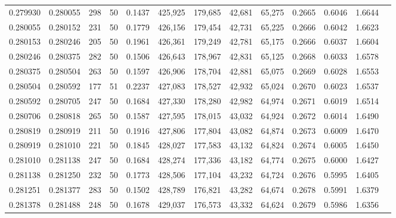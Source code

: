 \begin{tabular}{rrrrrrrrrrrrr}
0.279930 & 0.280055 &   298 &  50 &                                     0.1437 & 425,925 & 179,685 &  42,681 &  65,275 & 0.2665 & 0.6046 & 1.6644 \\
0.280055 & 0.280152 &   231 &  50 &                                     0.1779 & 426,156 & 179,454 &  42,731 &  65,225 & 0.2666 & 0.6042 & 1.6623 \\
0.280153 & 0.280246 &   205 &  50 &                                     0.1961 & 426,361 & 179,249 &  42,781 &  65,175 & 0.2666 & 0.6037 & 1.6604 \\
0.280246 & 0.280375 &   282 &  50 &                                     0.1506 & 426,643 & 178,967 &  42,831 &  65,125 & 0.2668 & 0.6033 & 1.6578 \\
0.280375 & 0.280504 &   263 &  50 &                                     0.1597 & 426,906 & 178,704 &  42,881 &  65,075 & 0.2669 & 0.6028 & 1.6553 \\
0.280504 & 0.280592 &   177 &  51 &                                     0.2237 & 427,083 & 178,527 &  42,932 &  65,024 & 0.2670 & 0.6023 & 1.6537 \\
0.280592 & 0.280705 &   247 &  50 &                                     0.1684 & 427,330 & 178,280 &  42,982 &  64,974 & 0.2671 & 0.6019 & 1.6514 \\
0.280706 & 0.280818 &   265 &  50 &                                     0.1587 & 427,595 & 178,015 &  43,032 &  64,924 & 0.2672 & 0.6014 & 1.6490 \\
0.280819 & 0.280919 &   211 &  50 &                                     0.1916 & 427,806 & 177,804 &  43,082 &  64,874 & 0.2673 & 0.6009 & 1.6470 \\
0.280919 & 0.281010 &   221 &  50 &                                     0.1845 & 428,027 & 177,583 &  43,132 &  64,824 & 0.2674 & 0.6005 & 1.6450 \\
0.281010 & 0.281138 &   247 &  50 &                                     0.1684 & 428,274 & 177,336 &  43,182 &  64,774 & 0.2675 & 0.6000 & 1.6427 \\
0.281138 & 0.281250 &   232 &  50 &                                     0.1773 & 428,506 & 177,104 &  43,232 &  64,724 & 0.2676 & 0.5995 & 1.6405 \\
0.281251 & 0.281377 &   283 &  50 &                                     0.1502 & 428,789 & 176,821 &  43,282 &  64,674 & 0.2678 & 0.5991 & 1.6379 \\
0.281378 & 0.281488 &   248 &  50 &                                     0.1678 & 429,037 & 176,573 &  43,332 &  64,624 & 0.2679 & 0.5986 & 1.6356 \\

\end{tabular}
